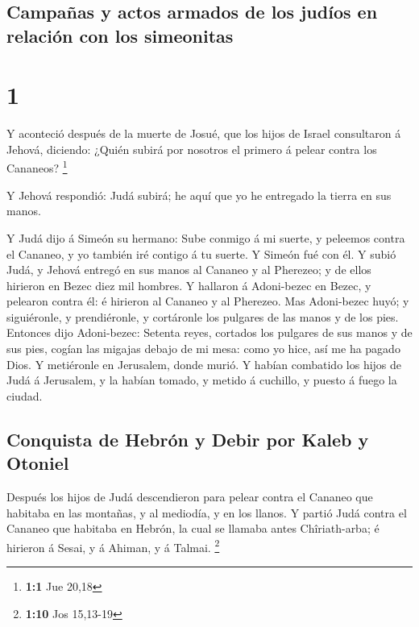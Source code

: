 \hypertarget{campauxf1as-y-actos-armados-de-los-juduxedos-en-relaciuxf3n-con-los-simeonitas}{%
\subsection{Campañas y actos armados de los judíos en relación con los
simeonitas}\label{campauxf1as-y-actos-armados-de-los-juduxedos-en-relaciuxf3n-con-los-simeonitas}}

\hypertarget{section}{%
\section{1}\label{section}}

 Y aconteció después de la muerte de Josué, que los hijos
de Israel consultaron á Jehová, diciendo: ¿Quién subirá por nosotros el
primero á pelear contra los Cananeos? \footnote{\textbf{1:1} Jue 20,18}

 Y Jehová respondió: Judá subirá; he aquí que yo he
entregado la tierra en sus manos.

 Y Judá dijo á Simeón su hermano: Sube conmigo á mi
suerte, y peleemos contra el Cananeo, y yo también iré contigo á tu
suerte. Y Simeón fué con él.  Y subió Judá, y Jehová
entregó en sus manos al Cananeo y al Pherezeo; y de ellos hirieron en
Bezec diez mil hombres.  Y hallaron á Adoni-bezec en
Bezec, y pelearon contra él: é hirieron al Cananeo y al Pherezeo.
 Mas Adoni-bezec huyó; y siguiéronle, y prendiéronle, y
cortáronle los pulgares de las manos y de los pies. 
Entonces dijo Adoni-bezec: Setenta reyes, cortados los pulgares de sus
manos y de sus pies, cogían las migajas debajo de mi mesa: como yo hice,
así me ha pagado Dios. Y metiéronle en Jerusalem, donde murió.
 Y habían combatido los hijos de Judá á Jerusalem, y la
habían tomado, y metido á cuchillo, y puesto á fuego la ciudad.

\hypertarget{conquista-de-hebruxf3n-y-debir-por-kaleb-y-otoniel}{%
\subsection{Conquista de Hebrón y Debir por Kaleb y
Otoniel}\label{conquista-de-hebruxf3n-y-debir-por-kaleb-y-otoniel}}

 Después los hijos de Judá descendieron para pelear contra
el Cananeo que habitaba en las montañas, y al mediodía, y en los llanos.
 Y partió Judá contra el Cananeo que habitaba en Hebrón,
la cual se llamaba antes Chîriath-arba; é hirieron á Sesai, y á Ahiman,
y á Talmai. \footnote{\textbf{1:10} Jos 15,13-19}

